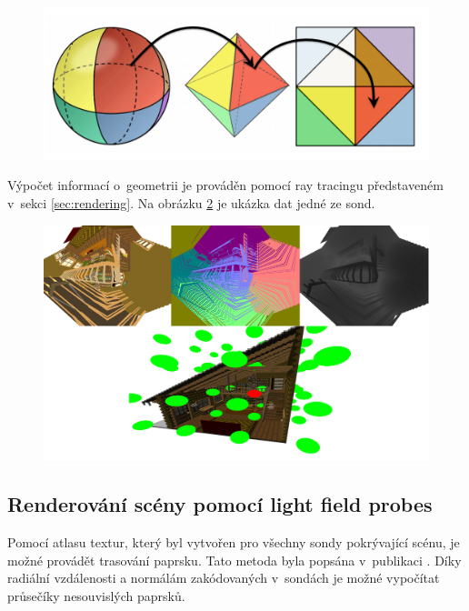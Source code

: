 \begin{figure}[H]
	\centering
	\includegraphics[scale=2]{images/octahedral_wrap.png}
	\captionsetup{justification=centering}
	\label{fig:octahedral_wrap}
\end{figure}

Výpočet informací o~geometrii je prováděn pomocí ray tracingu představeném v~sekci \ref{sec:rendering}. Na obrázku \ref{fig:probe_in_scene} je ukázka dat jedné ze sond.


\begin{figure}[H]
	\centering
	\includegraphics[scale=1]{images/probe_with_scene.png}
	\captionsetup{justification=centering}
	\label{fig:probe_in_scene}
\end{figure}

\subsection{Renderování scény pomocí light field probes}\label{sec:render_lfp}
Pomocí atlasu textur, který byl vytvořen pro všechny sondy pokrývající scénu, je možné provádět trasování paprsku. Tato metoda byla popsána v~publikaci \cite{light_field_probes}. Díky radiální vzdálenosti a normálám zakódovaných v~sondách je možné vypočítat průsečíky nesouvislých paprsků. 

